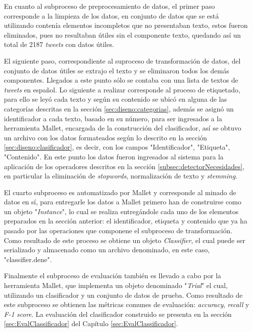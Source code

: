 En cuanto al subproceso de preprocesamiento de datos, el primer paso corresponde a la limpieza de los datos, en conjunto de datos que se está utilizando contenía elementos incompletos que no presentaban texto, estos fueron eliminados, pues no resultaban útiles sin el componente texto, quedando así un total de 2187 \textit{tweets} con datos útiles.

El siguiente paso, correspondiente al suproceso de transformación de datos, del conjunto de datos útiles se extrajo el texto y se eliminaron todos los demás componentes. Llegados a este punto sólo se contaba con una lista de textos de \textit{tweets} en español. Lo siguiente a realizar corresponde al proceso de etiquetado, para ello se leyó cada texto y según su contenido se ubicó en alguna de las categorías descritas en la sección \ref{sec:diseno:categorias}, además se asignó un identificador a cada texto, basado en su número, para ser ingresados a la herramienta Mallet, encargada de la construcción del clasificador, así se obtuvo un archivo con los datos formateados según lo descrito en la sección \ref{sec:diseno:clasificador}, es decir, con los campos "Identificador", "Etiqueta", "Contenido". En este punto los datos fueron ingresados al sistema para la aplicación de los operadores descritos en la sección \ref{subsec:detectorNecesidades}, en particular la eliminación de \textit{stopwords}, normalización de texto y \textit{stemming}.

El cuarto subproceso es automatizado por Mallet y corresponde al minado de datos en sí, para entregarle los datos a Mallet primero han de construirse como un objeto "\textit{Instance}", lo cual se realiza entregándole cada uno de los elementos preparados en la sección anterior: el identificador, etiqueta y contenido que ya ha pasado por las operaciones que componene el subproceso de transformación. Como resultado de este proceso se obtiene un objeto \textit{Classifier}, el cual puede ser serializado y almacenado como un archivo denominado, en este caso, "classifier.dene". 

Finalmente el subproceso de evaluación también es llevado a cabo por la herramienta Mallet, que implementa un objeto denominado "\textit{Trial}" el cual, utilizando un clasificador y un conjunto de datos de prueba. Como resultado de este subproceso se obtienen las métricas comunes de evaluación: \textit{accuracy}, \textit{recall} y \textit{F-1 score}. La evaluación del clasificador construido se presenta en la sección \ref{sec:EvalClassificador} del Capítulo \ref{sec:EvalClassificador}. 

